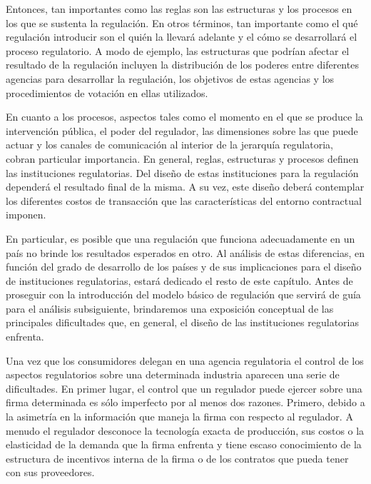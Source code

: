 \documentclass[
  12pt,
  spanish,
]{book}
\begin{document}
Entonces, tan importantes como las reglas son las estructuras y los
procesos en los que se sustenta la regulación. En otros términos, tan
importante como el qué regulación introducir son el quién la llevará
adelante y el cómo se desarrollará el proceso regulatorio. A modo de
ejemplo, las estructuras que podrían afectar el resultado de la
regulación incluyen la distribución de los poderes entre diferentes
agencias para desarrollar la regulación, los objetivos de estas agencias
y los procedimientos de votación en ellas utilizados.

En cuanto a los procesos, aspectos tales como el momento en el que se
produce la intervención pública, el poder del regulador, las dimensiones
sobre las que puede actuar y los canales de comunicación al interior de
la jerarquía regulatoria, cobran particular importancia. En general,
reglas, estructuras y procesos definen las instituciones regulatorias.
Del diseño de estas instituciones para la regulación dependerá el
resultado final de la misma. A su vez, este diseño deberá contemplar los
diferentes costos de transacción que las características del entorno
contractual imponen.

En particular, es posible que una regulación que funciona adecuadamente
en un país no brinde los resultados esperados en otro. Al análisis de
estas diferencias, en función del grado de desarrollo de los países y de
sus implicaciones para el diseño de instituciones regulatorias, estará
dedicado el resto de este capítulo. Antes de proseguir con la
introducción del modelo básico de regulación que servirá de guía para el
análisis subsiguiente, brindaremos una exposición conceptual de las
principales dificultades que, en general, el diseño de las instituciones
regulatorias enfrenta.

Una vez que los consumidores delegan en una agencia regulatoria el
control de los aspectos regulatorios sobre una determinada industria
aparecen una serie de dificultades. En primer lugar, el control que un
regulador puede ejercer sobre una firma determinada es sólo imperfecto
por al menos dos razones. Primero, debido a la asimetría en la
información que maneja la firma con respecto al regulador. A menudo el
regulador desconoce la tecnología exacta de producción, sus costos o la
elasticidad de la demanda que la firma enfrenta y tiene escaso
conocimiento de la estructura de incentivos interna de la firma o de los
contratos que pueda tener con sus proveedores.
\end{document}
